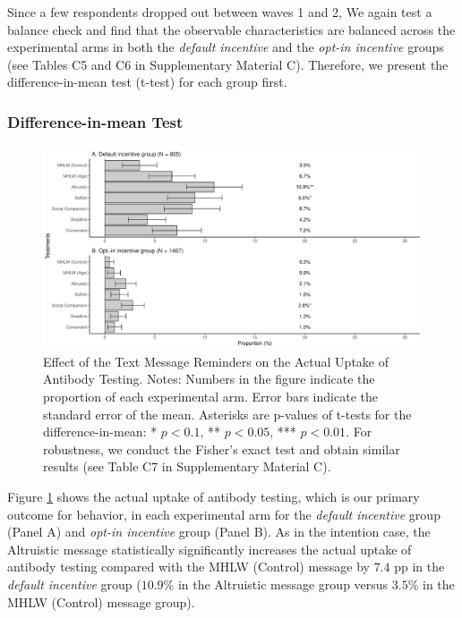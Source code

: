 \documentclass[
  11pt,
  a4paper
]{article}
\begin{document}
Since a few respondents dropped out between waves 1 and 2, We again test a balance check and find that the observable characteristics are balanced across the experimental arms in both the \emph{default incentive} and the \emph{opt-in incentive} groups (see Tables C5 and C6 in Supplementary Material C). Therefore, we present the difference-in-mean test (t-test) for each group first.

\hypertarget{difference-in-mean-test-1}{%
\subsubsection{Difference-in-mean Test}\label{difference-in-mean-test-1}}

\begin{figure}[t]
\includegraphics{Main-Document-LaTeX_files/figure-latex/ttest-act-test-1} \caption{Effect of the Text Message Reminders on the Actual Uptake of Antibody Testing. Notes: Numbers in the figure indicate the proportion of each experimental arm. Error bars indicate the standard error of the mean. Asterisks are p-values of t-tests for the difference-in-mean: * $p < 0.1$, ** $p < 0.05$, *** $p < 0.01$. For robustness, we conduct the Fisher's exact test and obtain similar results (see Table C7 in Supplementary Material C).}\label{fig:ttest-act-test}
\end{figure}

Figure \ref{fig:ttest-act-test} shows the actual uptake of antibody testing, which is our primary outcome for behavior, in each experimental arm for the \emph{default incentive} group (Panel A) and \emph{opt-in incentive} group (Panel B). As in the intention case, the Altruistic message statistically significantly increases the actual uptake of antibody testing compared with the MHLW (Control) message by \(7.4\) pp in the \emph{default incentive} group (\(10.9\)\% in the Altruistic message group versus \(3.5\)\% in the MHLW (Control) message group).
\end{document}
